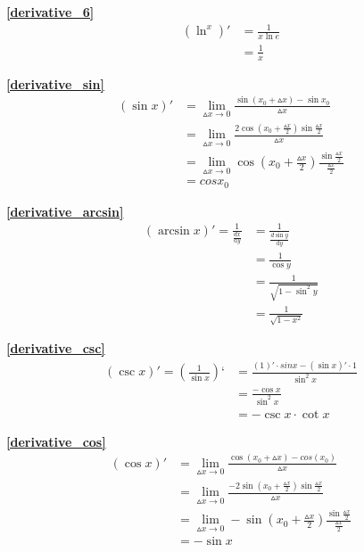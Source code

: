 \textbf{\large \ref{derivative_6}}
\begin{align*}
        \left(\ln^x\right)'&=\frac{1}{x\ln e}\\
        &=\frac{1}{x}
\end{align*}

\textbf{\large \ref{derivative_sin}}
\begin{align*}
        (\sin x)'&=\lim\limits_{\vartriangle x\to 0}\frac{\sin (x_0 +\vartriangle x)-\sin x_0}{\vartriangle x}\\
        &=\lim\limits_{\vartriangle x\to 0}\frac{2\cos(x_0+\frac{\vartriangle x}{2})\sin \frac{\vartriangle x}{2}}{\vartriangle x}\\
        &=\lim\limits_{\vartriangle x\to 0}\cos(x_0+\frac{\vartriangle x}{2})\frac{\sin\frac{\vartriangle x}{2}}{\frac{\vartriangle x}{2}}\\
        &=cos x_0
\end{align*}

\textbf{\large \ref{derivative_arcsin}}
\begin{align*}
        (\arcsin x)'=\frac{1}{\frac{dx}{\mathrm{d}{y}}}&=\frac{1}{\frac{d\sin y}{\mathrm{d}{y}}}\\
        &=\frac{1}{\cos y}\\
        &=\frac{1}{\sqrt{1-\sin^2 y}}\\
        &=\frac{1}{\sqrt{1-x^2}}
\end{align*}

\textbf{\large \ref{derivative_csc}}
\begin{align*}
        (\csc x)'=(\frac{1}{\sin x})‘&=\frac{(1)'\cdot sin x-(\sin x)'\cdot 1}{\sin^2x}\\
        &=\frac{-\cos x}{\sin^2x}\\
        &=-\csc x\cdot\cot x
\end{align*}

\textbf{\large \ref{derivative_cos}}
\begin{align*}
        (\cos x)'&=\lim\limits_{\vartriangle x\to 0}\frac{\cos(x_0+\vartriangle x)-cos(x_0)}{\vartriangle x}\\
        &=\lim\limits_{\vartriangle x\to 0}\frac{-2\sin \left(x_0+\frac{\vartriangle x}{2}\right)\sin\frac{\vartriangle x}{2}}{\vartriangle x}\\
        &=\lim\limits_{\vartriangle x\to 0}-\sin \left(x_0+\frac{\vartriangle x}{2}\right)\frac{\sin\frac{\vartriangle x}{2}}{\frac{\vartriangle x}{2}}\\
        &=-\sin x
\end{align*}


